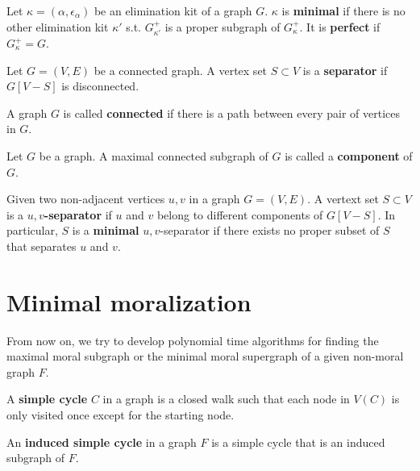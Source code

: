 \begin{definition}
Let $\kappa=(\alpha,\epsilon_{\alpha})$ be an elimination kit of a graph $G$. $\kappa$ is \textbf{minimal} if there is no other elimination kit $\kappa'$ s.t. $G_{\kappa'}^+$ is a proper subgraph of $G_{\kappa}^+$. It is \textbf{perfect} if $G_{\kappa}^+=G$. 
\end{definition}

\begin{definition}
Let $G=(V,E)$ be a connected graph. A vertex set $S\subset V$ is a \textbf{separator} if $G[V-S]$ is disconnected. 
\end{definition}

\begin{definition}
A graph $G$ is called \textbf{connected} if there is a path between every pair of vertices in $G$. 
\end{definition}

\begin{definition}
Let $G$ be a graph. A maximal connected subgraph of $G$ is called a \textbf{component} of $G$. 
\end{definition}

\begin{definition}
Given two non-adjacent vertices $u,v$ in a graph $G=(V,E)$. A vertext set $S \subset V$ is a \textbf{$u,v$-separator} if $u$ and $v$ belong to different components of $G[V-S]$. In particular, $S$ is a \textbf{minimal} $u,v$-separator if there exists no proper subset of $S$ that separates $u$ and $v$. 
\end{definition}


\section{Minimal moralization}
From now on, we try to develop polynomial time algorithms for finding the maximal moral subgraph or the minimal moral supergraph of a given non-moral graph $F$.

\begin{definition}
A \textbf{simple cycle} $C$ in a graph is a closed walk such that each node in $V(C)$ is only visited once except for the starting node.
\end{definition}

\begin{definition}
An \textbf{induced simple cycle} in a graph $F$ is a simple cycle that is an induced subgraph of $F$. 
\end{definition}

